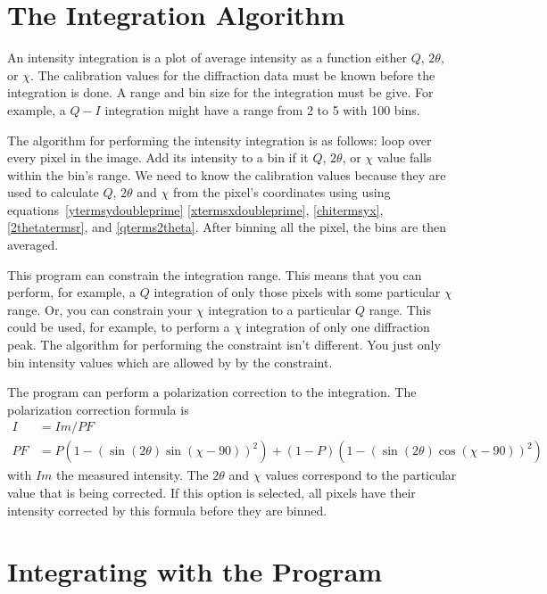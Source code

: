 \section{The Integration Algorithm}\label{integration_algorithm}

An intensity integration is a plot of average intensity as 
a function either $Q$, $2\theta$, or $\chi$. The calibration 
values for the diffraction data must be known before 
the integration is done. A range and bin size for the
integration must be give. For example, a $Q-I$ integration 
might have a range from 2 to 5 with 100 bins. 

The algorithm for performing the intensity integration
is as follows: loop over every pixel in the image. 
Add its intensity to a bin if it $Q$, $2\theta$, 
or $\chi$ value falls within the bin's range.
We need to know the calibration values because
they are used to calculate $Q$, $2\theta$ and $\chi$
from the pixel's coordinates using 
using equations~\ref{ytermsydoubleprime}
\ref{xtermsxdoubleprime}, \ref{chitermsyx}, 
\ref{2thetatermsr}, and \ref{qterms2theta}.
After binning all the pixel, the bins are then averaged.

This program can constrain the integration range. 
This means that you can perform, for example,
a $Q$ integration of only those pixels with some
particular $\chi$ range. Or, you can
constrain your $\chi$ integration to a particular
$Q$ range. This could be used, for example, to
perform a $\chi$ integration of only one
diffraction peak. The algorithm for performing
the constraint isn't different. You just
only bin intensity values which are allowed by 
by the constraint.

The program can perform a polarization 
correction to the integration. The polarization 
correction formula is
\begin{align}
    I&=Im/PF \\ 
    PF&=P(1 - (\sin(2\theta)\sin(\chi-90))^2) + 
    (1 - P)(1 - (\sin(2\theta)\cos(\chi-90))^2)
\end{align}
with $Im$ the measured intensity.  The $2\theta$ 
and $\chi$ values correspond to the particular 
value that is being corrected. If this option
is selected, all pixels have their intensity
corrected by this formula before they
are binned. 

\section{Integrating with the Program}

